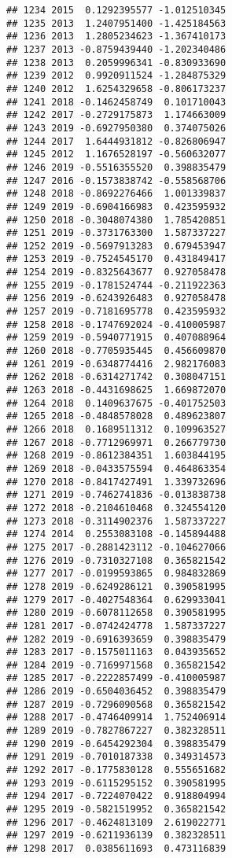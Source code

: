 \documentclass[
]{article}
\begin{document}
\begin{verbatim}
## 1234 2015  0.1292395577 -1.012510345
## 1235 2013  1.2407951400 -1.425184563
## 1236 2013  1.2805234623 -1.367410173
## 1237 2013 -0.8759439440 -1.202340486
## 1238 2013  0.2059996341 -0.830933690
## 1239 2012  0.9920911524 -1.284875329
## 1240 2012  1.6254329658 -0.806173237
## 1241 2018 -0.1462458749  0.101710043
## 1242 2017 -0.2729175873  1.174663009
## 1243 2019 -0.6927950380  0.374075026
## 1244 2017  1.6444931812 -0.826806947
## 1245 2012  1.1676528197 -0.560632077
## 1246 2019 -0.5516355520  0.398835479
## 1247 2016 -0.1573838742 -0.558568706
## 1248 2018 -0.8692276466  1.001339837
## 1249 2019 -0.6904166983  0.423595932
## 1250 2018 -0.3048074380  1.785420851
## 1251 2019 -0.3731763300  1.587337227
## 1252 2019 -0.5697913283  0.679453947
## 1253 2019 -0.7524545170  0.431849417
## 1254 2019 -0.8325643677  0.927058478
## 1255 2019 -0.1781524744 -0.211922363
## 1256 2019 -0.6243926483  0.927058478
## 1257 2019 -0.7181695778  0.423595932
## 1258 2018 -0.1747692024 -0.410005987
## 1259 2019 -0.5940771915  0.407088964
## 1260 2018 -0.7705935445  0.456609870
## 1261 2019 -0.6348774416  2.982176083
## 1262 2018 -0.6314271742  0.308047151
## 1263 2018 -0.4431698625  1.669872070
## 1264 2018  0.1409637675 -0.401752503
## 1265 2018 -0.4848578028  0.489623807
## 1266 2018  0.1689511312  0.109963527
## 1267 2018 -0.7712969971  0.266779730
## 1268 2019 -0.8612384351  1.603844195
## 1269 2018 -0.0433575594  0.464863354
## 1270 2018 -0.8417427491  1.339732696
## 1271 2019 -0.7462741836 -0.013838738
## 1272 2018 -0.2104610468  0.324554120
## 1273 2018 -0.3114902376  1.587337227
## 1274 2014  0.2553083108 -0.145894488
## 1275 2017 -0.2881423112 -0.104627066
## 1276 2019 -0.7310327108  0.365821542
## 1277 2017 -0.0199593865  0.984832869
## 1278 2019 -0.6249286121  0.390581995
## 1279 2017 -0.4027548364  0.629933041
## 1280 2019 -0.6078112658  0.390581995
## 1281 2017 -0.0742424778  1.587337227
## 1282 2019 -0.6916393659  0.398835479
## 1283 2017 -0.1575011163  0.043935652
## 1284 2019 -0.7169971568  0.365821542
## 1285 2017 -0.2222857499 -0.410005987
## 1286 2019 -0.6504036452  0.398835479
## 1287 2019 -0.7296090568  0.365821542
## 1288 2017 -0.4746409914  1.752406914
## 1289 2019 -0.7827867227  0.382328511
## 1290 2019 -0.6454292304  0.398835479
## 1291 2019 -0.7010187338  0.349314573
## 1292 2017 -0.1775830128  0.555651682
## 1293 2019 -0.6115295152  0.390581995
## 1294 2017 -0.7224070422  0.918804994
## 1295 2019 -0.5821519952  0.365821542
## 1296 2017 -0.4624813109  2.619022771
## 1297 2019 -0.6211936139  0.382328511
## 1298 2017  0.0385611693  0.473116839

\end{verbatim}
\end{document}
